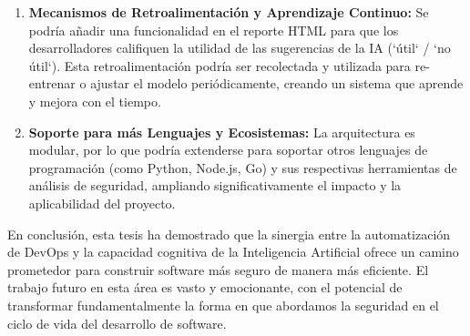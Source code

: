 \begin{enumerate}
    \item \textbf{Mecanismos de Retroalimentación y Aprendizaje Continuo:} Se podría añadir una funcionalidad en el reporte HTML para que los desarrolladores califiquen la utilidad de las sugerencias de la IA (`útil` / `no útil`). Esta retroalimentación podría ser recolectada y utilizada para re-entrenar o ajustar el modelo periódicamente, creando un sistema que aprende y mejora con el tiempo.

    \item \textbf{Soporte para más Lenguajes y Ecosistemas:} La arquitectura es modular, por lo que podría extenderse para soportar otros lenguajes de programación (como Python, Node.js, Go) y sus respectivas herramientas de análisis de seguridad, ampliando significativamente el impacto y la aplicabilidad del proyecto.
\end{enumerate}

En conclusión, esta tesis ha demostrado que la sinergia entre la automatización de DevOps y la capacidad cognitiva de la Inteligencia Artificial ofrece un camino prometedor para construir software más seguro de manera más eficiente. El trabajo futuro en esta área es vasto y emocionante, con el potencial de transformar fundamentalmente la forma en que abordamos la seguridad en el ciclo de vida del desarrollo de software.